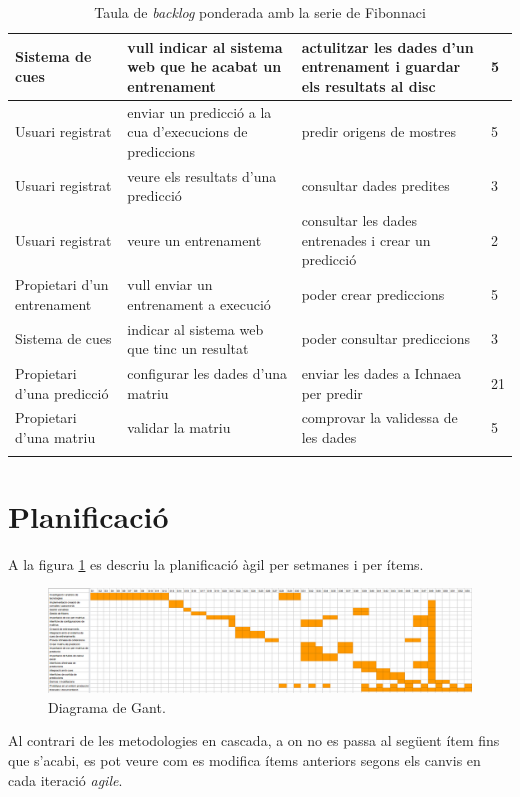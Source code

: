 \begin{center}
\begin{longtable}{ | p{3cm} | p{5cm} | p{5cm} | p{1cm} | }
Sistema de cues & vull indicar al sistema web que he acabat un entrenament & actulitzar les dades d'un entrenament i guardar els resultats al disc & 5 \\ \hline
Usuari registrat & enviar un predicció a la cua d'execucions de prediccions & predir origens de mostres & 5  \\ \hline
Usuari registrat & veure els resultats d'una predicció & consultar dades predites & 3  \\ \hline
Usuari registrat & veure un entrenament & consultar les dades entrenades i crear un predicció & 2  \\ \hline
Propietari d'un entrenament & vull enviar un entrenament a execució & poder crear prediccions & 5  \\ \hline
Sistema de cues & indicar al sistema web que tinc un resultat & poder consultar prediccions & 3  \\ \hline
Propietari d'una predicció & configurar les dades d'una matriu	& enviar les dades a Ichnaea per predir & 21  \\ \hline
Propietari d'una matriu & validar la matriu	 & comprovar la validessa de les dades & 5  \\ \hline
\caption{Taula de \textit{backlog} ponderada amb la serie de Fibonnaci}
\end{longtable}
\end{center}

\section{Planificació}
A la figura \ref{fig:gant} es descriu la planificació àgil per setmanes i per ítems.
\begin{figure}
    \includegraphics[scale=0.5]{img/conclussions/gantz.png}
    \caption{Diagrama de Gant.}
    \label{fig:gant}
\end{figure}

Al contrari de les metodologies en cascada, a on no es passa al següent ítem fins que s'acabi, es pot veure com es modifica ítems anteriors segons els canvis en cada iteració \textit{agile}.

